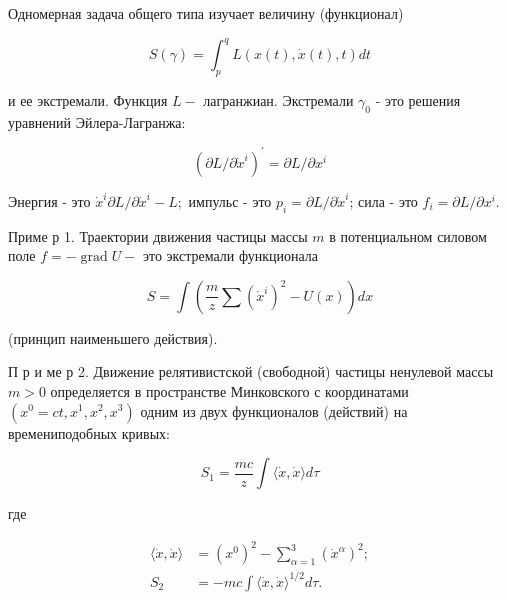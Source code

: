 \documentclass[10pt]{article}
\begin{document}
Одномерная задача общего типа изучает величину (функционал)



\[

S(\gamma)=\int_{p}^{q} L(x(t), \dot{x}(t), t) d t

\]



и ее экстремали. Функция $L-$ лагранжиан. Экстремали $\gamma_{0}$ - это решения уравнений Эйлера-Лагранжа:



\[

\left(\partial L / \partial \dot{x}^{i}\right)^{\prime}=\partial L / \partial x^{i}

\]



Энергия - это $\dot{x}^{i} \partial L / \partial \dot{x}^{i}-L ;$ импульс - это $p_{i}=\partial L / \partial \dot{x}^{i}$; сила - это $f_{i}=\partial L / \partial x^{i}$.



Приме р 1. Траектории движения частицы массы $m$ в потенциальном силовом поле $f=-\operatorname{grad} U-$ это экстремали функционала



\[

S=\int\left(\frac{m}{z} \sum\left(\dot{x}^{i}\right)^{2}-U(x)\right) d x

\]



(принцип наименьшего действия).



П р и ме р 2. Движение релятивистской (свободной) частицы ненулевой массы $m>0$ определяется в пространстве Минковского с координатами $\left(x^{0}=c t, x^{1}, x^{2}, x^{3}\right)$ одним из двух функционалов (действий) на времениподобных кривых:



\[

S_{1}=\frac{m c}{z} \int\langle\dot{x}, \dot{x}\rangle d \tau

\]



где



\[

\begin{aligned}

\langle\dot{x}, \dot{x}\rangle & =\left(x^{0}\right)^{2}-\sum_{\alpha=1}^{3}\left(\dot{x}^{\alpha}\right)^{2} ; \\

S_{2} & =-m c \int\langle\dot{x}, \dot{x}\rangle^{1 / 2} d \tau .

\end{aligned}

\]
\end{document}
